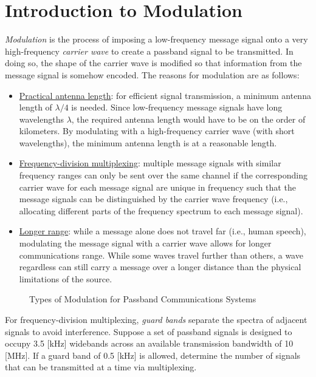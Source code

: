 \documentclass{report}
\begin{document}
\section{Introduction to Modulation}
\emph{Modulation} is the process of imposing a low-frequency message signal onto a very high-frequency \emph{carrier wave} to create a passband signal to be transmitted. In doing so, the shape of the carrier wave 
is modified so that information from the message signal is somehow encoded. The reasons for modulation are as follows:
\begin{itemize}
    \item \underline{Practical antenna length}: for efficient signal transmission, a minimum antenna length of $\lambda/4$ is needed. Since low-frequency message signals have long wavelengths $\lambda$, the required antenna length 
    would have to be on the order of kilometers. By modulating with a high-frequency carrier wave (with short wavelengths), the minimum antenna length is at a reasonable length.
    \item \underline{Frequency-division multiplexing}: multiple message signals with similar frequency ranges can only be sent over the same channel if the corresponding carrier wave for each message signal are unique in frequency such that 
    the message signals can be distinguished by the carrier wave frequency (i.e., allocating different parts of the frequency spectrum to each message signal).
    \item \underline{Longer range}: while a message alone does not travel far (i.e., human speech), modulating the message signal with a carrier wave allows for longer communications range. While some waves travel further than others, 
    a wave regardless can still carry a message over a longer distance than the physical limitations of the source.
\end{itemize}
\begin{sidewaysfigure}
    \caption{Types of Modulation for Passband Communications Systems}
    \label{modulation}
    \centering
    \resizebox{0.95\textwidth}{!}{%
        
    }
\end{sidewaysfigure}
\begin{example}
    For frequency-division multiplexing, \emph{guard bands} separate the spectra of adjacent signals to avoid interference. Suppose a set of passband signals is designed to occupy 3.5 [kHz] widebands across an 
    available transmission bandwidth of 10 [MHz]. If a guard band of 0.5 [kHz] is allowed, determine the number of signals that can be transmitted at a time via multiplexing.
\end{example}
\end{document}

